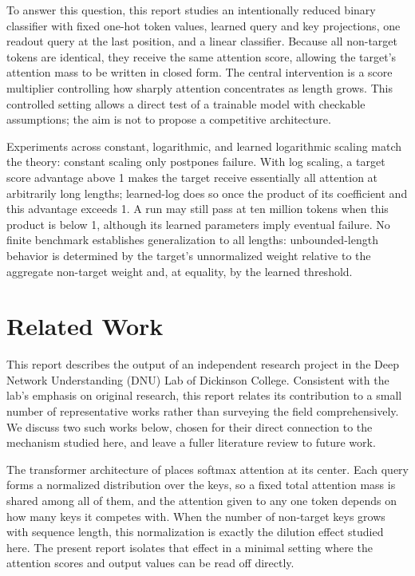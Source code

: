 \documentclass{article}
\begin{document}
To answer this question, this report studies an intentionally reduced binary
classifier with fixed one-hot token values, learned query and key projections,
one readout query at the last position, and a linear classifier. Because all
non-target tokens are identical, they receive the same attention score,
allowing the target's attention mass to be written in closed form. The central
intervention is a score multiplier controlling how sharply attention
concentrates as length grows. This controlled setting allows a direct test of a
trainable model with checkable assumptions; the aim is not to propose a
competitive architecture.

Experiments across constant, logarithmic, and learned logarithmic scaling match
the theory: constant scaling only postpones failure. With log scaling, a target
score advantage above 1 makes the target receive essentially all attention at
arbitrarily long lengths; learned-log does so once the product of its coefficient
and this advantage exceeds 1. A run may still pass at ten million tokens when
this product is below 1, although its learned parameters imply eventual failure.
No finite benchmark establishes generalization to all lengths: unbounded-length
behavior is determined by the target's unnormalized weight relative to the
aggregate non-target weight and, at equality, by the learned threshold.

\section{Related Work}
\label{sec:related-work}

This report describes the output of an independent research project in the Deep
Network Understanding (DNU) Lab of Dickinson College. Consistent with the lab's
emphasis on original research, this report relates its contribution to a small
number of representative works rather than surveying the field comprehensively.
We discuss two such works below, chosen for their direct connection to the
mechanism studied here, and leave a fuller literature review to future work.

The transformer architecture of \citet{vaswani2017attention} places softmax
attention at its center. Each query forms a normalized distribution over the
keys, so a fixed total attention mass is shared among all of them, and the
attention given to any one token depends on how many keys it competes with.
When the number of non-target keys grows with sequence length, this
normalization is exactly the dilution effect studied here. The present report
isolates that effect in a minimal setting where the attention scores and output
values can be read off directly.
\end{document}
